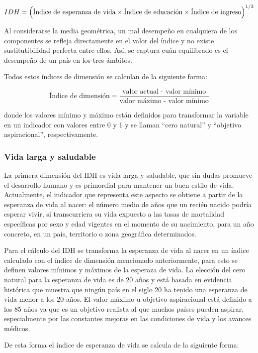 \documentclass[
  10pt,
]{article}
\begin{document}
\[IDH = \Bigl(\text{Índice de esperanza de vida}\times\text{Índice de educación}\times\text{Índice de ingreso}\Bigl)^{1/3}\]

Al considerarse la media geométrica, un mal desempeño en cualquiera de
los componentes se refleja directamente en el valor del índice y no
existe sustitutibilidad perfecta entre ellos. Así, se captura cuán
equilibrado es el desempeño de un país en los tres ámbitos.

Todos estos índices de dimensión se calculan de la siguiente forma:

\[\text{Índice de dimensión}=\frac{\text{valor actual - valor mínimo}}{\text{valor máximo - valor mínimo}}\]

donde los valores mínimo y máximo están definidos para transformar la
variable en un indicador con valores entre 0 y 1 y se llaman ``cero
natural'' y ``objetivo aspiracional'', respectivamente.

\subsubsection{Vida larga y saludable}\label{vida-larga-y-saludable}

La primera dimensión del IDH es vida larga y saludable, que sin dudas
promueve el desarrollo humano y es primordial para mantener un buen
estilo de vida. Actualmente, el indicador que representa este aspecto se
obtiene a partir de la esperanza de vida al nacer: el número medio de
años que un recién nacido podría esperar vivir, si transcurriera su vida
expuesto a las tasas de mortalidad específicas por sexo y edad vigentes
en el momento de su nacimiento, para un año concreto, en un país,
territorio o zona geográfica determinados.

Para el cálculo del IDH se transforma la esperanza de vida al nacer en
un índice calculado con el índice de dimensión mencionado anteriormente,
para esto se definen valores mínimos y máximos de la esperaza de vida.
La elección del cero natural para la esperanza de vida es de 20 años y
está basada en evidencia histórica que muestra que ningún país en el
siglo 20 ha tenido una esperanza de vida menor a los 20 años. El valor
máximo u objetivo aspiracional está definido a los 85 años ya que es un
objetivo realista al que muchos países pueden aspirar, especialmente por
las constantes mejoras en las condiciones de vida y los avances médicos.

De esta forma el índice de esperanza de vida se calcula de la siguiente
forma:
\end{document}
